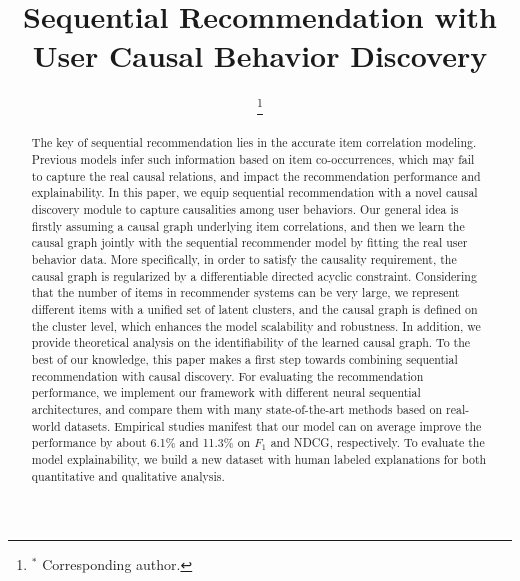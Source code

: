 \documentclass[conference]{IEEEtran}
\theoremstyle{definition}
\theoremstyle{theorem}
\theoremstyle{proof}
\theoremstyle{remark}
\begin{document}
\title{Sequential Recommendation with User Causal Behavior Discovery}
\author{\thanks{$^*$ Corresponding author.}
}
\maketitle

\begin{abstract}
The key of sequential recommendation lies in the accurate item correlation modeling.
Previous models infer such information based on item co-occurrences, which may fail to capture the real causal relations, and impact the recommendation performance and explainability.
In this paper, we equip sequential recommendation with a novel causal discovery module to capture causalities among user behaviors.
Our general idea is firstly assuming a causal graph underlying item correlations, and then we learn the causal graph jointly with the sequential recommender model by fitting the real user behavior data.
More specifically, in order to satisfy the causality requirement, the causal graph is regularized by a differentiable directed acyclic constraint.
Considering that the number of items in recommender systems can be very large, we represent different items with a unified set of latent clusters, and the causal graph is defined on the cluster level, which enhances the model scalability and robustness.
In addition, we provide theoretical analysis on the identifiability of the learned causal graph.
To the best of our knowledge, this paper makes a first step towards combining sequential recommendation with causal discovery.
For evaluating the recommendation performance, we implement our framework with different neural sequential architectures, and compare them with many state-of-the-art methods based on real-world datasets. Empirical studies manifest that our model can on average improve the performance by about {6.1\% and 11.3\%} on $F_1$ and NDCG, respectively.
To evaluate the model explainability, we build a new dataset with human labeled explanations for both quantitative and qualitative analysis.
\end{abstract}
\end{document}
